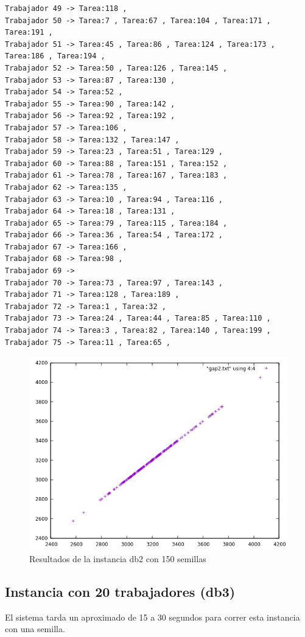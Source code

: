 \documentclass{article}
\begin{document}
\begin{lstlisting}
Trabajador 49 -> Tarea:118 , 
Trabajador 50 -> Tarea:7 , Tarea:67 , Tarea:104 , Tarea:171 , Tarea:191 , 
Trabajador 51 -> Tarea:45 , Tarea:86 , Tarea:124 , Tarea:173 , Tarea:186 , Tarea:194 , 
Trabajador 52 -> Tarea:50 , Tarea:126 , Tarea:145 , 
Trabajador 53 -> Tarea:87 , Tarea:130 , 
Trabajador 54 -> Tarea:52 , 
Trabajador 55 -> Tarea:90 , Tarea:142 , 
Trabajador 56 -> Tarea:92 , Tarea:192 , 
Trabajador 57 -> Tarea:106 , 
Trabajador 58 -> Tarea:132 , Tarea:147 , 
Trabajador 59 -> Tarea:23 , Tarea:51 , Tarea:129 , 
Trabajador 60 -> Tarea:88 , Tarea:151 , Tarea:152 , 
Trabajador 61 -> Tarea:78 , Tarea:167 , Tarea:183 , 
Trabajador 62 -> Tarea:135 , 
Trabajador 63 -> Tarea:10 , Tarea:94 , Tarea:116 , 
Trabajador 64 -> Tarea:18 , Tarea:131 , 
Trabajador 65 -> Tarea:79 , Tarea:115 , Tarea:184 , 
Trabajador 66 -> Tarea:36 , Tarea:54 , Tarea:172 , 
Trabajador 67 -> Tarea:166 , 
Trabajador 68 -> Tarea:98 , 
Trabajador 69 -> 
Trabajador 70 -> Tarea:73 , Tarea:97 , Tarea:143 , 
Trabajador 71 -> Tarea:128 , Tarea:189 , 
Trabajador 72 -> Tarea:1 , Tarea:32 , 
Trabajador 73 -> Tarea:24 , Tarea:44 , Tarea:85 , Tarea:110 , 
Trabajador 74 -> Tarea:3 , Tarea:82 , Tarea:140 , Tarea:199 , 
Trabajador 75 -> Tarea:11 , Tarea:65 , 
\end{lstlisting}

\begin{figure}[H]
	\centering
	\includegraphics[scale=0.9]{imgs/gap2.png}
	\caption{Resultados de la instancia db2 con 150 semillas}
\end{figure}

\subsection{Instancia con 20 trabajadores (db3)}
El sistema tarda un aproximado de 15 a 30 segundos para correr esta instancia con una semilla.
\end{document}
